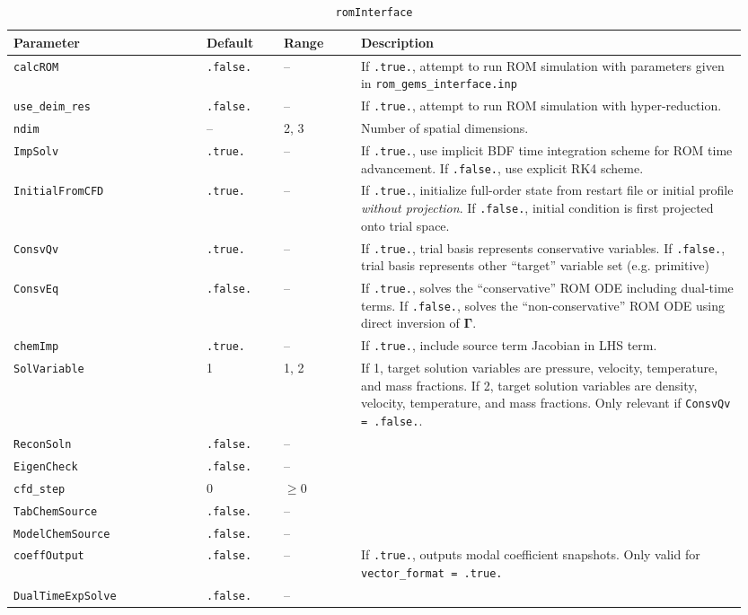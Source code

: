 \begin{table}[H]
    \centering
    \begin{tabular}{p{0.25\linewidth} p{0.1\linewidth} p{0.1\linewidth} p{0.5\linewidth}}
        \toprule
        Parameter & Default & Range & Description \\
        \midrule
        \verb|calcROM| & \verb|.false.| & -- & If \verb|.true.|, attempt to run ROM simulation with parameters given in \verb|rom_gems_interface.inp| \\
        \verb|use_deim_res| & \verb|.false.| & -- & If \verb|.true.|, attempt to run ROM simulation with hyper-reduction. \\
        \verb|ndim| & -- & 2, 3 & Number of spatial dimensions. \\
        \verb|ImpSolv| & \verb|.true.| & -- & If \verb|.true.|, use implicit BDF time integration scheme for ROM time advancement. If \verb|.false.|, use explicit RK4 scheme. \\
        \verb|InitialFromCFD| & \verb|.true.| & -- & If \verb|.true.|, initialize full-order state from restart file or initial profile \textit{without projection}. If \verb|.false.|, initial condition is first projected onto trial space.  \\
        \verb|ConsvQv| & \verb|.true.| & -- & If \verb|.true.|, trial basis represents conservative variables. If \verb|.false.|, trial basis represents other ``target'' variable set (e.g. primitive) \\
        \verb|ConsvEq| & \verb|.false.| & -- & If \verb|.true.|, solves the ``conservative'' ROM ODE including dual-time terms. If \verb|.false.|, solves the ``non-conservative'' ROM ODE using direct inversion of $\boldsymbol{\Gamma}$.  \\
        \verb|chemImp| & \verb|.true.| & -- & If \verb|.true.|, include source term Jacobian in LHS term. \\
        \verb|SolVariable| & 1 & 1, 2 & If 1, target solution variables are pressure, velocity, temperature, and mass fractions. If 2, target solution variables are density, velocity, temperature, and mass fractions. Only relevant if \verb|ConsvQv = .false.|. \\
        \verb|ReconSoln|  & \verb|.false.| & -- &  \\
        \verb|EigenCheck| & \verb|.false.| & -- &  \\
        \verb|cfd_step| & 0 & $\ge 0$ &  \\
        \verb|TabChemSource| & \verb|.false.| & -- &  \\
        \verb|ModelChemSource| & \verb|.false.| & -- &  \\
        \verb|coeffOutput| & \verb|.false.| & -- & If \verb|.true.|, outputs modal coefficient snapshots. Only valid for \verb|vector_format = .true.| \\
        \verb|DualTimeExpSolve| & \verb|.false.| & -- &  \\
        \bottomrule 
    \end{tabular}
    \caption{\texttt{romInterface}}
\end{table}

